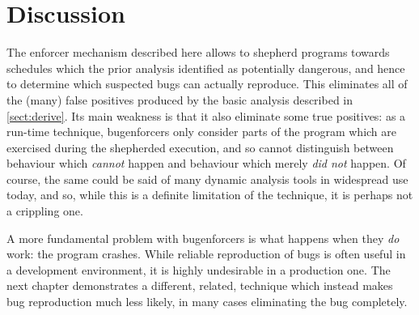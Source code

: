 \section{Discussion}

The enforcer mechanism described here allows {\technique} to shepherd
programs towards schedules which the prior analysis identified as
potentially dangerous, and hence to determine which suspected bugs can
actually reproduce.  This eliminates all of the (many) false positives
produced by the basic analysis described in \autoref{sect:derive}.
Its main weakness is that it also eliminate some true positives: as a
run-time technique, \glspl{bugenforcer} only consider parts of the
program which are exercised during the shepherded execution, and so
cannot distinguish between behaviour which \emph{cannot} happen and
behaviour which merely \emph{did not} happen.  Of course, the same
could be said of many dynamic analysis tools in widespread use today,
and so, while this is a definite limitation of the technique, it is
perhaps not a crippling one.

A more fundamental problem with \glspl{bugenforcer} is what happens
when they \emph{do} work: the program crashes.  While reliable
reproduction of bugs is often useful in a development environment, it
is highly undesirable in a production one.  The next chapter
demonstrates a different, related, technique which instead makes bug
reproduction much less likely, in many cases eliminating the bug
completely.

